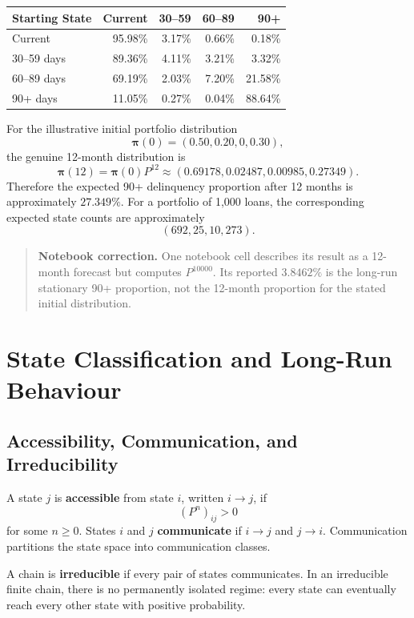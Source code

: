 \documentclass[12pt,openany]{book}
\theoremstyle{definition}
\theoremstyle{remark}
\begin{document}
\begin{center}
\begin{tabular}{L{0.22\textwidth}rrrr}
\toprule
\textbf{Starting State} & \textbf{Current} & \textbf{30--59} &
\textbf{60--89} & \textbf{90+} \\
\midrule
Current & 95.98\% & 3.17\% & 0.66\% & 0.18\% \\
30--59 days & 89.36\% & 4.11\% & 3.21\% & 3.32\% \\
60--89 days & 69.19\% & 2.03\% & 7.20\% & 21.58\% \\
90+ days & 11.05\% & 0.27\% & 0.04\% & 88.64\% \\
\bottomrule
\end{tabular}
\end{center}

For the illustrative initial portfolio distribution
\[
\boldsymbol{\pi}(0)=(0.50,0.20,0,0.30),
\]
the genuine 12-month distribution is
\[
\boldsymbol{\pi}(12)
=\boldsymbol{\pi}(0)P^{12}
\approx(0.69178,0.02487,0.00985,0.27349).
\]
Therefore the expected 90+ delinquency proportion after 12 months is
approximately \(27.349\%\). For a portfolio of 1,000 loans, the corresponding
expected state counts are approximately
\[
(692,25,10,273).
\]

\begin{quote}
\colorbox{diagramOrange!12}{%
\parbox{\dimexpr\linewidth-2\fboxsep\relax}{%
\textbf{Notebook correction.} One notebook cell describes its result as a
12-month forecast but computes \(P^{10000}\). Its reported \(3.8462\%\) is
the long-run stationary 90+ proportion, not the 12-month proportion for the
stated initial distribution.}}
\end{quote}

\section{State Classification and Long-Run Behaviour}

\subsection{Accessibility, Communication, and Irreducibility}

A state \(j\) is \textbf{accessible} from state \(i\), written
\(i\to j\), if
\[
(P^n)_{ij}>0
\]
for some \(n\geq0\). States \(i\) and \(j\) \textbf{communicate} if
\(i\to j\) and \(j\to i\). Communication partitions the state space into
communication classes.

A chain is \textbf{irreducible} if every pair of states communicates. In an
irreducible finite chain, there is no permanently isolated regime: every
state can eventually reach every other state with positive probability.
\end{document}
